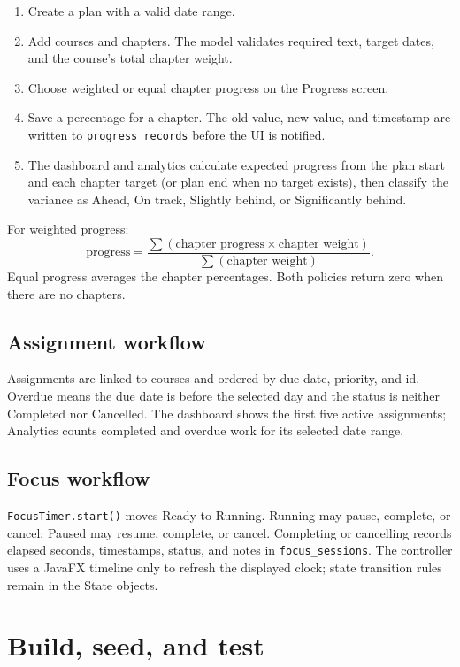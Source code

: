 \documentclass[11pt,a4paper]{article}
\newcommand{\code}[1]{\texttt{#1}}
\begin{document}
\begin{enumerate}
  \item Create a plan with a valid date range.
  \item Add courses and chapters. The model validates required text, target dates, and the course's total chapter weight.
  \item Choose weighted or equal chapter progress on the Progress screen.
  \item Save a percentage for a chapter. The old value, new value, and timestamp are written to \code{progress\_records} before the UI is notified.
  \item The dashboard and analytics calculate expected progress from the plan start and each chapter target (or plan end when no target exists), then classify the variance as Ahead, On track, Slightly behind, or Significantly behind.
\end{enumerate}

For weighted progress:
\[
  \text{progress} = \frac{\sum(\text{chapter progress}\times\text{chapter weight})}
  {\sum(\text{chapter weight})}.
\]
Equal progress averages the chapter percentages. Both policies return zero when there are no chapters.

\subsection{Assignment workflow}

Assignments are linked to courses and ordered by due date, priority, and id. Overdue means the due date is before the selected day and the status is neither Completed nor Cancelled. The dashboard shows the first five active assignments; Analytics counts completed and overdue work for its selected date range.

\subsection{Focus workflow}

\code{FocusTimer.start()} moves Ready to Running. Running may pause, complete, or cancel; Paused may resume, complete, or cancel. Completing or cancelling records elapsed seconds, timestamps, status, and notes in \code{focus\_sessions}. The controller uses a JavaFX timeline only to refresh the displayed clock; state transition rules remain in the State objects.

\section{Build, seed, and test}
\end{document}
